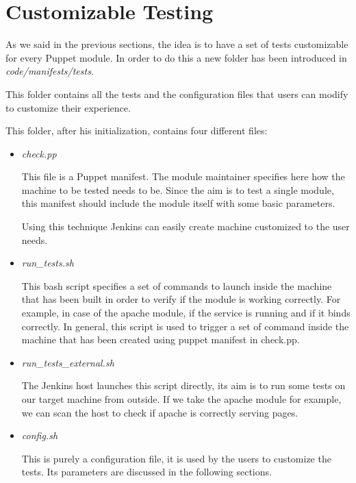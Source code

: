 \section{Customizable Testing}

As we said in the previous sections, the idea is to have a set of tests
customizable for every Puppet module. In order to do this a new folder has
been introduced in \textit{code/manifests/tests}.

This folder contains all the tests and the configuration files that users
can modify to customize their experience.

This folder, after his initialization, contains four different files:

\begin{itemize}
  \item \textit{check.pp}

This file is a Puppet manifest. The module maintainer specifies here how
the machine to be tested needs to be. Since the aim is to test a single
module, this manifest should include the module itself with some basic
parameters.

Using this technique Jenkins can easily create machine customized to the
user needs.

  \item \textit{run\_tests.sh}

This bash script specifies a set of commands to launch inside the machine
that has been built in order to verify if the module is working correctly.
For example, in case of the apache module, if the service is running and
if it binds correctly. In general, this script is used to trigger a set of
command inside the machine that has been created using puppet manifest in
check.pp.

  \item \textit{run\_tests\_external.sh}
  
The Jenkins host launches this script directly, its aim is to run some
tests on our target machine from outside. If we take the apache module for
example, we can scan the host to check if apache is correctly serving
pages.

  \item \textit{config.sh}
  
This is purely a configuration file, it is used by the users to customize
the tests. Its parameters are discussed in the following sections.

\end{itemize}


